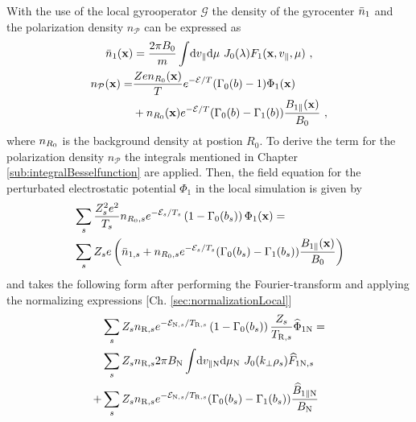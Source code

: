 With the use of the local gyrooperator $\mathcal{G}$ the density of the gyrocenter $\bar{n}_1$ and the polarization density $n_\mathcal{P}$ can be expressed as
\begin{gather}
	\bar{n}_1(\boldsymbol{\mathbf{x}}) = \frac{2\pi B_0}{m} \int \! \mathrm{d}v_\parallel\mathrm{d}\mu ~ J_0(\lambda) F_1(\boldsymbol{\mathbf{x}}, v_\parallel, \mu)~, \\
    \begin{aligned}
	    n_\mathcal{P}(\boldsymbol{\mathbf{x}}) = &\frac{Ze n_{R_0}(\boldsymbol{\mathbf{x}})}{T} e^{-\mathcal{E}/T} (\Gamma_0(b) - 1) \Phi_1(\boldsymbol{\mathbf{x}}) \\
                            &+ n_{R_0}(\boldsymbol{\mathbf{x}}) e^{-\mathcal{E}/T} (\Gamma_0(b) - \Gamma_1(b))\frac{B_{1\parallel}(\boldsymbol{\mathbf{x}})}{B_0}~,
    \end{aligned}
	\label{eq:particleDensityLocal}
\end{gather}
where $n_{R_0}$ is the background density at postion $R_0$. To derive the term for the polarization density $n_\mathcal{P}$ the integrals mentioned in Chapter \ref{sub:integralBesselfunction} are applied. Then, the field equation for the perturbated electrostatic potential $\Phi_1$ in the local simulation is given by
\begin{gather}
    \begin{aligned}
        &\sum_s \frac{Z_s^2e^2}{T_s} n_{R_0,s} e^{-\mathcal{E}_s/T_s} \left(1 - \Gamma_0(b_s)\right) \Phi_1(\boldsymbol{\mathbf{x}}) = \\
        &\sum_s Z_se \left(\bar{n}_{1,s} + n_{R_0,s} e^{-\mathcal{E}_s/T_s} (\Gamma_0(b_s) - \Gamma_1(b_s))\frac{B_{1\parallel}(\boldsymbol{\mathbf{x}})}{B_0} \right)
        \label{eq:fieldPotentialLocal}
    \end{aligned}
\end{gather}
and takes the following form after performing the Fourier-transform and applying the normalizing expressions [Ch. \ref{sec:normalizationLocal}]
\begin{gather}
    \begin{aligned}
        &\sum_s Z_s n_{\mathrm{R},s} e^{-\mathcal{E}_{\mathrm{N},s}/T_{\mathrm{R},s}} \left(1 - \Gamma_0(b_s)\right) \frac{Z_s}{T_{\mathrm{R},s}} \widehat{\Phi}_{1 \mathrm{N}} = \\
        &\sum_s Z_sn_{\mathrm{R},s} 2\pi B_\mathrm{N} \int \! \mathrm{d}v_{\parallel \mathrm{N}} \mathrm{d}\mu_\mathrm{N} ~ J_0(k_\perp \rho_s) \widehat{F}_{1\mathrm{N},s} \\
        + & \sum_s Z_sn_{\mathrm{R},s} e^{-\mathcal{E}_{\mathrm{N},s}/T_{\mathrm{R},s}} (\Gamma_0(b_s) - \Gamma_1(b_s))\frac{\widehat{B}_{1\parallel \mathrm{N}}}{B_\mathrm{N}}
        \label{eq:fieldPotentialLocalNorm}
    \end{aligned}
\end{gather}
\newpage

